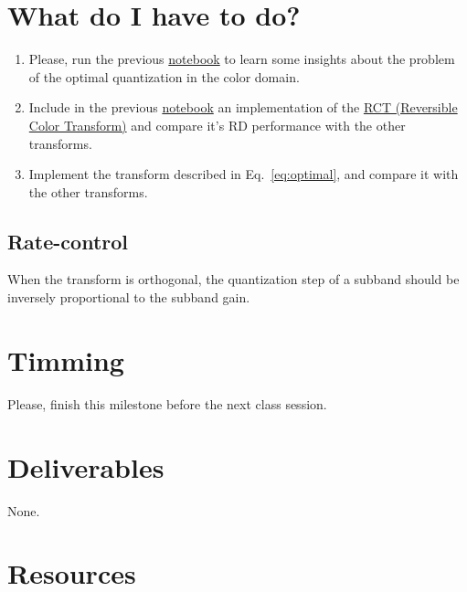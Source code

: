 
\section{What do I have to do?}

\begin{enumerate}
\item Please, run the previous
  \href{https://github.com/Sistemas-Multimedia/Sistemas-Multimedia.github.io/blob/master/study_guide/06-color_transform/performance.ipynb}{notebook}
  to learn some insights about the problem of the optimal
  quantization in the color domain.
\item Include in the previous
  \href{https://github.com/Sistemas-Multimedia/Sistemas-Multimedia.github.io/blob/master/study_guide/06-color_transform/performance.ipynb}{notebook}
  an implementation of the
  \href{https://en.wikipedia.org/wiki/JPEG_2000#Color_components_transformation}{RCT
    (Reversible Color Transform)} and compare it's RD performance with
  the other transforms.
\item Implement the transform described in Eq.~\ref{eq:optimal}, and
  compare it with the other transforms.
\end{enumerate}

\subsection{Rate-control}
When the transform is orthogonal, the quantization step of a subband should be inversely proportional to the subband gain.  

\section{Timming}

Please, finish this milestone before the next class session.

\section{Deliverables}

None.

\section{Resources}

\renewcommand{\addcontentsline}[3]{}%

